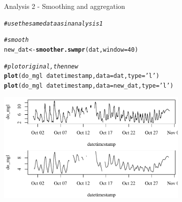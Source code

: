\documentclass[xcolor=svgnames]{beamer}\usepackage[]{graphicx}\usepackage[]{color}
\makeatletter
\newcommand{\hlnum}[1]{\textcolor[rgb]{0.686,0.059,0.569}{#1}}%
\newcommand{\hlstr}[1]{\textcolor[rgb]{0.192,0.494,0.8}{#1}}%
\newcommand{\hlcom}[1]{\textcolor[rgb]{0.678,0.584,0.686}{\textit{#1}}}%
\newcommand{\hlopt}[1]{\textcolor[rgb]{0,0,0}{#1}}%
\newcommand{\hlstd}[1]{\textcolor[rgb]{0.345,0.345,0.345}{#1}}%
\newcommand{\hlkwb}[1]{\textcolor[rgb]{0.69,0.353,0.396}{#1}}%
\newcommand{\hlkwc}[1]{\textcolor[rgb]{0.333,0.667,0.333}{#1}}%
\newcommand{\hlkwd}[1]{\textcolor[rgb]{0.737,0.353,0.396}{\textbf{#1}}}%
\newenvironment{kframe}{%
 \def\at@end@of@kframe{}%
 \ifinner\ifhmode%
  \def\at@end@of@kframe{\end{minipage}}%
  \begin{minipage}{\columnwidth}%
 \fi\fi%
 \def\FrameCommand##1{\hskip\@totalleftmargin \hskip-\fboxsep
 \colorbox{shadecolor}{##1}\hskip-\fboxsep
     \hskip-\linewidth \hskip-\@totalleftmargin \hskip\columnwidth}%
 \MakeFramed {\advance\hsize-\width
   \@totalleftmargin\z@ \linewidth\hsize
   \@setminipage}}%
 {\par\unskip\endMakeFramed%
 \at@end@of@kframe}
\newenvironment{knitrout}{}{} %
\makeatother
\begin{document}
\begin{frame}[containsverbatim]{Analysis 2 - Smoothing and aggregation}
\begin{knitrout}\scriptsize
{}\color{fgcolor}\begin{kframe}
\begin{alltt}
\hlcom{# use the same data as in analysis 1}

\hlcom{# smooth }
\hlstd{new_dat} \hlkwb{<-} \hlkwd{smoother.swmpr}\hlstd{(dat,} \hlkwc{window} \hlstd{=} \hlnum{40}\hlstd{)}

\hlcom{# plot original, then new}
\hlkwd{plot}\hlstd{(do_mgl} \hlopt{~} \hlstd{datetimestamp,} \hlkwc{data} \hlstd{= dat,} \hlkwc{type} \hlstd{=} \hlstr{'l'}\hlstd{)}
\hlkwd{plot}\hlstd{(do_mgl} \hlopt{~} \hlstd{datetimestamp,} \hlkwc{data} \hlstd{= new_dat,} \hlkwc{type} \hlstd{=} \hlstr{'l'}\hlstd{)}
\end{alltt}
\end{kframe}
\end{knitrout}
\begin{knitrout}\scriptsize
{}\color{fgcolor}

{\centering \includegraphics[width=0.7\textwidth]{figure/unnamed-chunk-13} 

}



\end{knitrout}
\end{frame}
\end{document}
